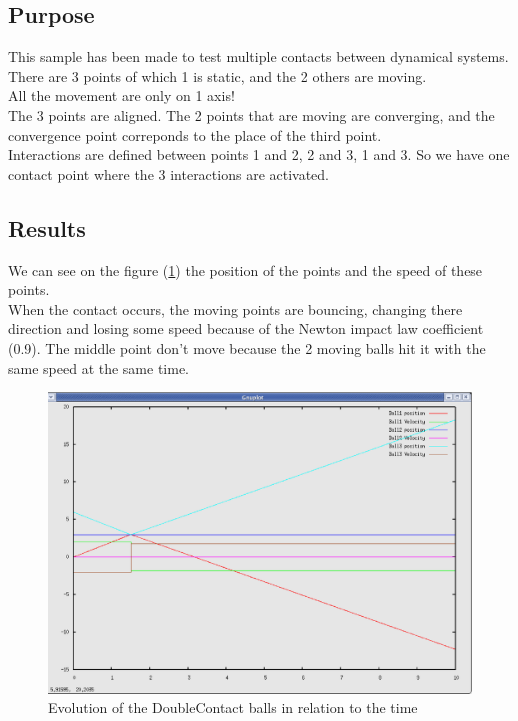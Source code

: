 \subsection{Purpose}
This sample has been made to test multiple contacts between dynamical systems.\\
There are 3 points of which 1 is static, and the 2 others are moving.\\
All the movement are only on 1 axis!\\
The 3 points are aligned. The 2 points that are moving are converging, and the convergence point correponds to the place of the third point.\\
Interactions are defined between points 1 and 2, 2 and 3, 1 and 3. So we have one contact point where the 3 interactions are activated.

\subsection{Results}
We can see on the figure (\ref{fig: DoubleContact}) the position of the points and the speed of these points.\\
When the contact occurs, the moving points are bouncing, changing there direction and losing some speed because of the Newton impact law coefficient (0.9). The middle point don't move because the 2 moving balls hit it with the same speed at the same time.
	\begin{figure}
	\begin{center}
	\includegraphics[scale=0.6, clip]{figure/DoubleContact.eps}
	\caption{Evolution of the DoubleContact balls in relation to the time}
	\label{fig: DoubleContact}
	\end{center}
	\end{figure}


